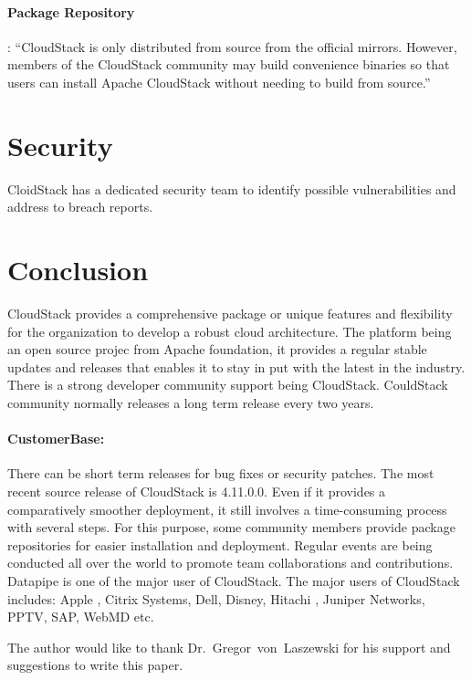 \paragraph {Package Repository}: ``CloudStack is only distributed from source from the official
mirrors. However, members of the CloudStack community may build convenience binaries 
so that users can install Apache CloudStack without needing to build from source.''~\cite{hid-sp18-417-www-cloudstack-package-repo}


\section{Security}
CloidStack has a dedicated security team to identify possible vulnerabilities and address to breach reports. 

\section{Conclusion}

CloudStack provides a comprehensive package or unique features and flexibility for the 
organization to develop a robust cloud architecture. The platform being an open source projec
from Apache foundation, it provides a regular stable updates and releases that enables it to 
stay in put with the latest in the industry. There is a strong developer community support
being CloudStack. CouldStack community normally releases a long term release every two years.

\paragraph {CustomerBase:} There can be short term releases for bug fixes or security patches.
The most recent source release of CloudStack is 4.11.0.0. Even if it provides a comparatively smoother deployment,
it still involves a time-consuming process with several steps. For this purpose, some community 
members provide package repositories for easier installation and deployment. 
Regular events are being conducted all over the world to promote team collaborations and 
contributions. Datapipe is one of the major user of CloudStack. The major users of CloudStack
includes: Apple , Citrix Systems,  Dell,  Disney, Hitachi , Juniper Networks, PPTV, SAP, 
WebMD etc. 


\begin{acks}

  The author would like to thank Dr.~Gregor~von~Laszewski for his
  support and suggestions to write this paper.

\end{acks}


 
